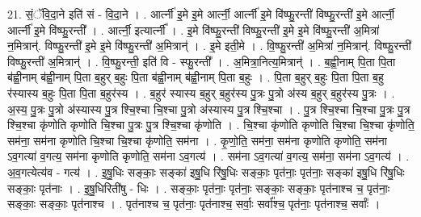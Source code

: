 \documentclass[17pt]{extarticle}
\begin{document}
21. सं॒ॅवि॒दा॒ने इति॑ सं - वि॒दा॒ने । . आर्त्नी॑ इ॒मे इ॒मे आर्त्नी॒ आर्त्नी॑ इ॒मे वि॑ष्फु॒रन्ती॑ विष्फु॒रन्ती॑ इ॒मे आर्त्नी॒ आर्त्नी॑ इ॒मे वि॑ष्फु॒रन्ती᳚ । . आर्त्नी॒ इत्यार्त्नी᳚ । . इ॒मे वि॑ष्फु॒रन्ती॑ विष्फु॒रन्ती॑ इ॒मे इ॒मे वि॑ष्फु॒रन्ती॑ अ॒मित्रा॑ न॒मित्रान्॑. विष्फु॒रन्ती॑ इ॒मे इ॒मे वि॑ष्फु॒रन्ती॑ अ॒मित्रान्॑ । . इ॒मे इती॒मे । . वि॒ष्फु॒रन्ती॑ अ॒मित्रा॑ न॒मित्रान्॑. विष्फु॒रन्ती॑ विष्फु॒रन्ती॑ अ॒मित्रान्॑ । . वि॒ष्फु॒रन्ती॒ इति॑ वि - स्फु॒रन्ती᳚ । . अ॒मित्रा॒नित्य॒मित्रान्॑ । . ब॒ह्वी॒नाम् पि॒ता पि॒ता ब॑ह्वी॒नाम् ब॑ह्वी॒नाम् पि॒ता ब॒हुर् ब॒हुः पि॒ता ब॑ह्वी॒नाम् ब॑ह्वी॒नाम् पि॒ता ब॒हुः । . पि॒ता ब॒हुर् ब॒हुः पि॒ता पि॒ता ब॒हु र॑स्यास्य ब॒हुः पि॒ता पि॒ता ब॒हुर॑स्य । . ब॒हुर॑ स्यास्य ब॒हुर् ब॒हुर॑स्य पु॒त्रः पु॒त्रो अ॑स्य ब॒हुर् ब॒हुर॑स्य पु॒त्रः । . अ॒स्य॒ पु॒त्रः पु॒त्रो अ॑स्यास्य पु॒त्र श्चि॒श्चा चि॒श्चा पु॒त्रो अ॑स्यास्य पु॒त्र श्चि॒श्चा । . पु॒त्र श्चि॒श्चा चि॒श्चा पु॒त्रः पु॒त्र श्चि॒श्चा कृ॑णोति कृणोति चि॒श्चा पु॒त्रः पु॒त्र श्चि॒श्चा कृ॑णोति । . चि॒श्चा कृ॑णोति कृणोति चि॒श्चा चि॒श्चा कृ॑णोति॒ सम॑ना॒ सम॑ना कृणोति चि॒श्चा चि॒श्चा कृ॑णोति॒ सम॑ना । . कृ॒णो॒ति॒ सम॑ना॒ सम॑ना कृणोति कृणोति॒ सम॑ना ऽव॒गत्या॑ व॒गत्य॒ सम॑ना कृणोति कृणोति॒ सम॑ना ऽव॒गत्य॑ । . सम॑ना ऽव॒गत्या॑ व॒गत्य॒ सम॑ना॒ सम॑ना ऽव॒गत्य॑ । . अ॒व॒गत्येत्य॑व - गत्य॑ । . इ॒षु॒धिः सङ्काः॒ सङ्का॑ इषु॒धि रि॑षु॒धिः सङ्काः॒ पृत॑नाः॒ पृत॑नाः॒ सङ्का॑ इषु॒धि रि॑षु॒धिः सङ्काः॒ पृत॑नाः । . इ॒षु॒धिरिती॑षु - धिः । . सङ्काः॒ पृत॑नाः॒ पृत॑नाः॒ सङ्काः॒ सङ्काः॒ पृत॑नाश्च च॒ पृत॑नाः॒ सङ्काः॒ सङ्काः॒ पृत॑नाश्च । . पृत॑नाश्च च॒ पृत॑नाः॒ पृत॑नाश्च॒ सर्वाः॒ सर्वा᳚श्च॒ पृत॑नाः॒ पृत॑नाश्च॒ सर्वाः᳚ । \newline
\end{document}
